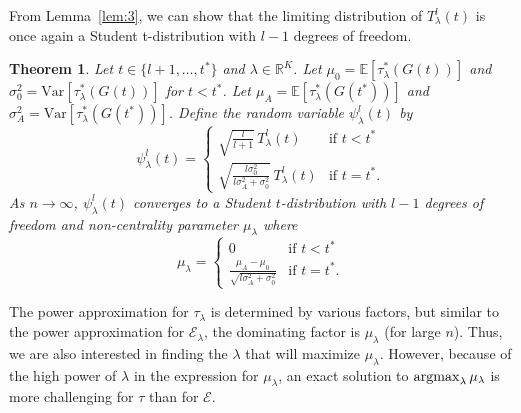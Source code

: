 \documentclass[10pt,journal,compsoc]{IEEEtran}
\newtheorem{theorem}{Theorem}
\theoremstyle{definition}
\newcommand{\argmax}{\operatornamewithlimits{argmax}}
\begin{document}
From Lemma~\ref{lem:3}, we can show that the limiting distribution of
$T_{\lambda}^{l}(t)$ is once again a Student t-distribution with
$l-1$ degrees of freedom.
\begin{theorem}
  \label{thm:5}
  Let $t \in \{l+1, \dots, t^{*}\}$ and $\lambda \in
  \mathbb{R}^{K}$. Let $\mu_0 = \mathbb{E}[\tau_{\lambda}^{*}(G(t))]$
  and $\sigma_0^{2} = \mathrm{Var}[\tau_{\lambda}^{*}(G(t))]$ for $t <
  t^{*}$. Let $\mu_A = \mathbb{E}[\tau_{\lambda}^{*}(G(t^{*}))]$ and
  $\sigma_{A}^{2} = \mathrm{Var}[\tau_{\lambda}^{*}(G(t^{*}))]$. Define
  the random variable $\psi_{\lambda}^{l}(t)$ by
  \begin{equation}
    \label{eq:50}
    \psi_{\lambda}^{l}(t) = \begin{cases}
      \sqrt{\tfrac{l}{l+1}}\, T_{\lambda}^{l}(t) & \text{if $t <
        t^{*}$} \\
      \sqrt{\tfrac{l \sigma_0^{2}}{l \sigma_A^{2} + \sigma_0^{2}} }\,
      T_{\lambda}^{l}(t) & \text{if $t = t^{*}$}.
        \end{cases}
  \end{equation}
  As $n \rightarrow \infty$, $\psi_{\lambda}^{l}(t)$ converges to a Student $t$-distribution with $l - 1$ degrees of freedom and
  non-centrality parameter $\mu_{\lambda}$ where
  \begin{equation}
    \label{eq:51}
    \mu_{\lambda} = \begin{cases} 0 & \text{if $t < t^{*}$} \\
      \frac{\mu_A - \mu_0}{\sqrt{l \sigma_A^{2} + \sigma_0^{2}}} &
       \text{if $t = t^{*}$}.
      \end{cases}
  \end{equation}
\end{theorem}
The power approximation for $\tau_{\lambda}$ is determined by various
factors, but similar to the power approximation for
$\mathcal{E}_{\lambda}$, the dominating factor is $\mu_\lambda$ (for
large $n$). Thus, we are also interested in finding the $\lambda$
that will maximize $\mu_\lambda$. However, because of the high power
of $\lambda$ in the expression for $\mu_{\lambda}$, an exact 
solution to $\argmax_{\lambda}{\mu_{\lambda}}$ is more challenging for
$\tau$ than for $\mathcal{E}$. 
\end{document}
